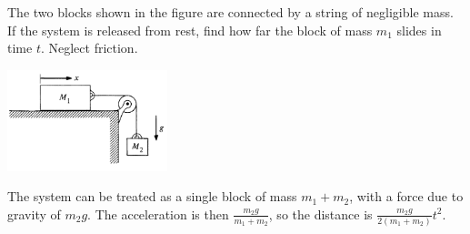 \documentclass{esg8012pset}
\date{September 17}
\begin{document}
\begin{problem}[Problem 2.2]
  The two blocks shown in the figure are connected by a string of negligible mass. If the system is released from rest, find how far the block of mass $m_1$ slides in time $t$. Neglect friction.
  \begin{center}\includegraphics[width=0.35\textwidth]{ps02_1}\end{center}
\end{problem}
\begin{solution}
  The system can be treated as a single block of mass $m_1 + m_2$, with a force due to gravity of $m_2 g$.  The acceleration is then $\frac{m_2 g}{m_1 + m_2}$, so the distance is $\frac{m_2 g}{2(m_1 + m_2)} t^2$.
\end{solution}
\end{document}
